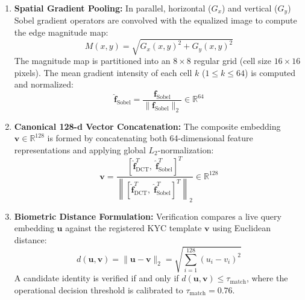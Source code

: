 \documentclass[conference]{IEEEtran}
\begin{document}
\begin{enumerate}
    \item \textbf{Spatial Gradient Pooling:} In parallel, horizontal ($G_x$) and vertical ($G_y$) Sobel gradient operators are convolved with the equalized image to compute the edge magnitude map:
    \begin{equation}
        M(x, y) = \sqrt{G_x(x, y)^2 + G_y(x, y)^2}
    \end{equation}
    The magnitude map is partitioned into an $8 \times 8$ regular grid (cell size $16 \times 16$ pixels). The mean gradient intensity of each cell $k$ ($1 \le k \le 64$) is computed and normalized:
    \begin{equation}
        \hat{\mathbf{f}}_{\text{Sobel}} = \frac{\mathbf{f}_{\text{Sobel}}}{\|\mathbf{f}_{\text{Sobel}}\|_2} \in \mathbb{R}^{64}
    \end{equation}
    \item \textbf{Canonical 128-d Vector Concatenation:} The composite embedding $\mathbf{v} \in \mathbb{R}^{128}$ is formed by concatenating both 64-dimensional feature representations and applying global $L_2$-normalization:
    \begin{equation}
        \mathbf{v} = \frac{\left[\hat{\mathbf{f}}_{\text{DCT}}^T, \; \hat{\mathbf{f}}_{\text{Sobel}}^T\right]^T}{\left\|\left[\hat{\mathbf{f}}_{\text{DCT}}^T, \; \hat{\mathbf{f}}_{\text{Sobel}}^T\right]^T\right\|_2} \in \mathbb{R}^{128}
    \end{equation}
    \item \textbf{Biometric Distance Formulation:} Verification compares a live query embedding $\mathbf{u}$ against the registered KYC template $\mathbf{v}$ using Euclidean distance:
    \begin{equation}
        d(\mathbf{u}, \mathbf{v}) = \|\mathbf{u} - \mathbf{v}\|_2 = \sqrt{\sum_{i=1}^{128}(u_i - v_i)^2}
    \end{equation}
    A candidate identity is verified if and only if $d(\mathbf{u}, \mathbf{v}) \le \tau_{\text{match}}$, where the operational decision threshold is calibrated to $\tau_{\text{match}} = 0.76$.
\end{enumerate}
\end{document}
